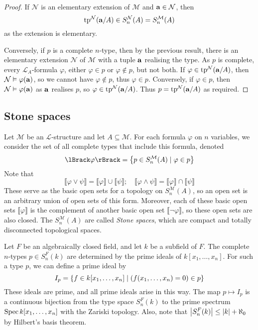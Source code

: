 \begin{proof}
    If \( \mathcal N \) is an elementary extension of \( \mathcal M \) and \( \vb a \in \mathcal N \), then
    \[ \operatorname{tp}^{\mathcal N}(\vb a/A) \in S_n^{\mathcal N}(A) = S_n^{\mathcal M}(A) \]
    as the extension is elementary.

    Conversely, if \( p \) is a complete \( n \)-type, then by the previous result, there is an elementary extension \( \mathcal N \) of \( \mathcal M \) with a tuple \( \vb a \) realising the type.
    As \( p \) is complete, every \( \mathcal L_A \)-formula \( \varphi \), either \( \varphi \in p \) or \( \varphi \notin p \), but not both.
    If \( \varphi \in \operatorname{tp}^{\mathcal N}(\vb a/A) \), then \( \mathcal N \vDash \varphi(\vb a) \), so we cannot have \( \varphi \notin p \), thus \( \varphi \in p \).
    Conversely, if \( \varphi \in p \), then \( \mathcal N \vDash \varphi(\vb a) \) as \( \vb a \) realises \( p \), so \( \varphi \in \operatorname{tp}^{\mathcal N}(\vb a/A) \).
    Thus \( p = \operatorname{tp}^{\mathcal N}(\vb a/A) \) as required.
\end{proof}

\subsection{Stone spaces}
Let \( \mathcal M \) be an \( \mathcal L \)-structure and let \( A \subseteq \mathcal M \).
For each formula \( \varphi \) on \( n \) variables, we consider the set of all complete types that include this formula, denoted
\[ \lBrack\varphi\rBrack = \qty{p \in S_n^{\mathcal M}(A) \mid \varphi \in p} \]
Note that
\[ \lBrack\varphi \vee \psi\rBrack = \lBrack\varphi\rBrack \cup \lBrack\psi\rBrack;\quad \lBrack\varphi \wedge \psi\rBrack = \lBrack\varphi\rBrack \cap \lBrack\psi\rBrack \]
These serve as the basic open sets for a topology on \( S_n^{\mathcal M}(A) \), so an open set is an arbitrary union of open sets of this form.
Moreover, each of these basic open sets \( \lBrack\varphi\rBrack \) is the complement of another basic open set \( \lBrack\neg\varphi\rBrack \), so these open sets are also closed.
The \( S_n^{\mathcal M}(A) \) are called \emph{Stone spaces}, which are compact and totally disconnected topological spaces.
\begin{example}
    Let \( F \) be an algebraically closed field, and let \( k \) be a subfield of \( F \).
    The complete \( n \)-types \( p \in S_n^F(k) \) are determined by the prime ideals of \( k[x_1, \dots, x_n] \).
    For such a type \( p \), we can define a prime ideal by
    \[ I_p = \qty{f \in k[x_1, \dots, x_n] \mid (f(x_1, \dots, x_n) = 0) \in p} \]
    These ideals are prime, and all prime ideals arise in this way.
    The map \( p \mapsto I_p \) is a continuous bijection from the type space \( S_n^F(k) \) to the prime spectrum \( \operatorname{Spec} k[x_1, \dots, x_n] \) with the Zariski topology.
    Also, note that \( \abs{S_n^F(k)} \leq \abs{k} + \aleph_0 \) by Hilbert's basis theorem.
\end{example}

